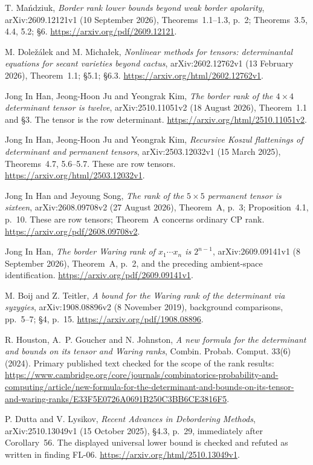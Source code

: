 T. Ma\'ndziuk,
\emph{Border rank lower bounds beyond weak border apolarity},
arXiv:2609.12121v1 (10 September 2026),
Theorems~1.1--1.3, p.~2; Theorems~3.5, 4.4, 5.2; \S6.
\url{https://arxiv.org/pdf/2609.12121}.

M. Dole\v z\'alek and M. Micha\l ek,
\emph{Nonlinear methods for tensors: determinantal equations
for secant varieties beyond cactus},
arXiv:2602.12762v1 (13 February 2026),
Theorem~1.1; \S5.1; \S6.3.
\url{https://arxiv.org/html/2602.12762v1}.

Jong In Han, Jeong-Hoon Ju and Yeongrak Kim,
\emph{The border rank of the $4\times4$ determinant tensor is twelve},
arXiv:2510.11051v2 (18 August 2026),
Theorem~1.1 and \S3. The tensor is the row determinant.
\url{https://arxiv.org/html/2510.11051v2}.

Jong In Han, Jeong-Hoon Ju and Yeongrak Kim,
\emph{Recursive Koszul flattenings of determinant and permanent tensors},
arXiv:2503.12032v1 (15 March 2025),
Theorems~4.7, 5.6--5.7. These are row tensors.
\url{https://arxiv.org/html/2503.12032v1}.

Jong In Han and Jeyoung Song,
\emph{The rank of the $5\times5$ permanent tensor is sixteen},
arXiv:2608.09708v2 (27 August 2026),
Theorem~A, p.~3; Proposition~4.1, p.~10.
These are row tensors; Theorem~A concerns ordinary CP rank.
\url{https://arxiv.org/pdf/2608.09708v2}.

Jong In Han,
\emph{The border Waring rank of $x_1\cdots x_n$ is $2^{n-1}$},
arXiv:2609.09141v1 (8 September 2026),
Theorem~A, p.~2, and the preceding ambient-space identification.
\url{https://arxiv.org/pdf/2609.09141v1}.

M. Boij and Z. Teitler,
\emph{A bound for the Waring rank of the determinant via syzygies},
arXiv:1908.08896v2 (8 November 2019),
background comparisons, pp.~5--7; \S4, p.~15.
\url{https://arxiv.org/pdf/1908.08896}.

R. Houston, A.~P. Goucher and N. Johnston,
\emph{A new formula for the determinant and bounds on its tensor and Waring ranks},
Combin. Probab. Comput. 33(6) (2024).
Primary published text checked for the scope of the rank results:
\url{https://www.cambridge.org/core/journals/combinatorics-probability-and-computing/article/new-formula-for-the-determinant-and-bounds-on-its-tensor-and-waring-ranks/E33F5E0726A0691B250C3BB6CE3816F5}.

P. Dutta and V. Lysikov,
\emph{Recent Advances in Debordering Methods},
arXiv:2510.13049v1 (15 October 2025),
\S4.3, p.~29, immediately after Corollary~56.
The displayed universal lower bound is checked and refuted as
written in finding FL-06.
\url{https://arxiv.org/html/2510.13049v1}.

